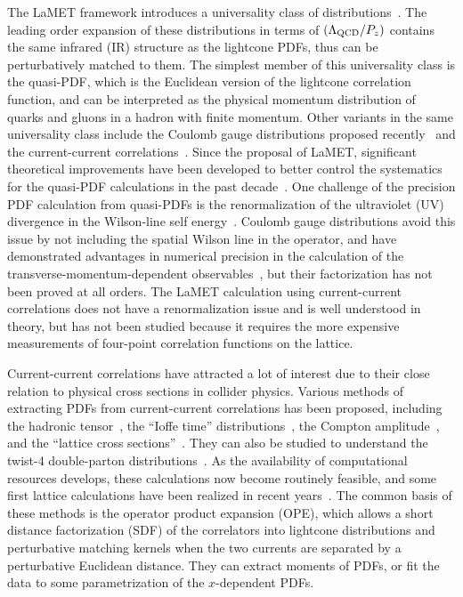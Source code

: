 \documentclass[floatfix,twocolumn,prl,showpacs,preprintnumbers,amsmath,nofootinbib,amssymb,noeprint,superscriptaddress]{revtex4-1}
\begin{document}
The LaMET framework introduces a universality class of distributions~\cite{Ji:2020ect}. The leading order expansion of these distributions in terms of $(\Lambda_{\rm QCD}/P_z)$ contains the same infrared (IR) structure as the lightcone PDFs, thus can be perturbatively matched to them. The simplest member of this universality class is the quasi-PDF, which is the Euclidean version of the lightcone correlation function, and can be interpreted as the physical momentum distribution of quarks and gluons in a hadron with finite momentum. Other variants in the same universality class include the Coulomb gauge distributions proposed recently~\cite{Gao:2023lny,Zhao:2023ptv} and the current-current correlations~\cite{Ji:2020ect}. Since the proposal of LaMET, significant theoretical improvements have been developed to better control the systematics for the quasi-PDF calculations in the past decade~\cite{Ji:2017oey,Ishikawa:2017faj,Green:2017xeu,Constantinou:2017sej,Stewart:2017tvs,Alexandrou:2017huk,Izubuchi:2018srq,Li:2020xml,Chen:2020ody,Ji:2020brr,Gao:2021hxl,LatticePartonLPC:2021gpi,Su:2022fiu,Zhang:2023bxs,Ji:2023pba,Liu:2023onm,Ji:2024hit,Chen:2025cxr,Ji:2026vir}. One challenge of the precision PDF calculation from quasi-PDFs is the renormalization of the ultraviolet (UV) divergence in the Wilson-line self energy~\cite{Chen:2016fxx,Green:2017xeu,Ji:2017oey,Ishikawa:2017faj,Ji:2020brr}. Coulomb gauge distributions avoid this issue by not including the spatial Wilson line in the operator, and have demonstrated advantages in numerical precision in the calculation of the transverse-momentum-dependent  observables~\cite{Gao:2023lny,Zhao:2023ptv}, but their factorization has not been proved at all orders. The LaMET calculation using current-current correlations does not have a renormalization issue and is well understood in theory, but has not been studied because it requires the more expensive measurements of four-point correlation functions on the lattice.

Current-current correlations have attracted a lot of interest due to their close relation to physical cross sections in collider physics. Various methods of extracting PDFs from current-current correlations has been proposed, including the hadronic tensor~\cite{Liu:1999ak}, the ``Ioffe time'' distributions~\cite{Braun:2007wv}, the Compton amplitude~\cite{Chambers:2017dov}, and the ``lattice cross sections''~\cite{Ma:2017pxb}. They can also be studied to understand the twist-4 double-parton distributions~\cite{Diehl:2011yj}. As the availability of computational resources develops, these calculations now become routinely feasible, and some first lattice calculations have been realized in recent years~\cite{Chambers:2017dov,Bali:2018spj,Liang:2019frk,Sufian:2020vzb,Bali:2021gel,Zimmermann:2024zde}. 
The common basis of these methods is the operator product expansion (OPE), which allows a short distance factorization (SDF) of the correlators into lightcone distributions and perturbative matching kernels when the two currents are separated by a perturbative Euclidean distance. They can extract moments of PDFs, or fit the data to some parametrization of the $x$-dependent PDFs.
\end{document}
